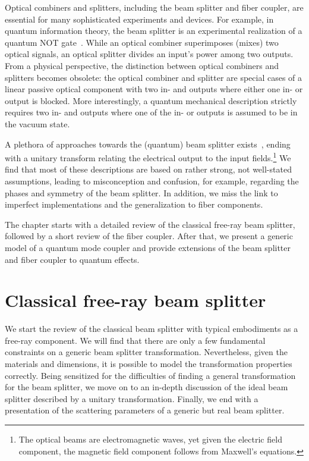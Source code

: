 Optical combiners and splitters, including the beam splitter and fiber coupler, are essential for many sophisticated experiments and devices.
For example, in quantum information theory, the beam splitter is an experimental realization of a quantum NOT gate~\cite{Adami1998}.
While an optical combiner superimposes (mixes) two optical signals, an optical splitter divides an input's power among two outputs.
From a physical perspective, the distinction between optical combiners and splitters becomes obsolete: the optical combiner and splitter are special cases of a linear passive optical component with two in- and outputs where either one in- or output is blocked.
More interestingly, a quantum mechanical description strictly requires two in- and outputs where one of the in- or outputs is assumed to be in the vacuum state.

A plethora of approaches towards the (quantum) beam splitter exists~\cite{Leonhardt2010,Gerry2005,Loudon2000}, ending with a unitary transform relating the electrical output to the input fields.\footnote{The optical beams are electromagnetic waves, yet given the electric field component, the magnetic field component follows from Maxwell's equations.}
We find that most of these descriptions are based on rather strong, not well-stated assumptions, leading to misconception and confusion, for example, regarding the phases and symmetry of the beam splitter.
In addition, we miss the link to imperfect implementations and the generalization to fiber components.

The chapter starts with a detailed review of the classical free-ray beam splitter, followed by a short review of the fiber coupler. After that, we present a generic model of a quantum mode coupler and provide extensions of the beam splitter and fiber coupler to quantum effects.

\section{Classical free-ray beam splitter}\label{sec:beam_splitter}


We start the review of the classical beam splitter with typical embodiments as a free-ray component.
We will find that there are only a few fundamental constraints on a generic beam splitter transformation.
Nevertheless, given the materials and dimensions, it is possible to model the transformation properties correctly.
Being sensitized for the difficulties of finding a general transformation for the beam splitter, we move on to an in-depth discussion of the ideal beam splitter described by a unitary transformation.
Finally, we end with a presentation of the scattering parameters of a generic but real beam splitter.

